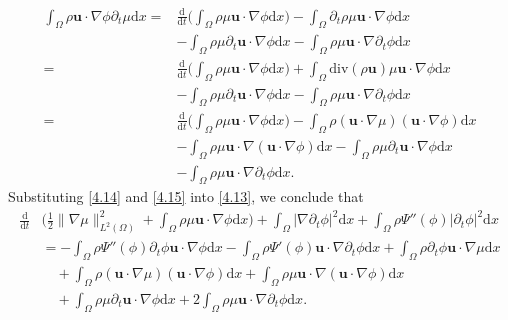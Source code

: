 \documentclass[11pt]{article}
\numberwithin{equation}{section}
\begin{document}
\begin{equation}
\begin{split}\label{4.15}
\int_{\Omega}\rho\mathbf{u}\cdot\nabla\phi\partial_t\mu\mathrm{d}x
=&\frac{\mathrm{d}}{\mathrm{d}t}\Big(\int_{\Omega}\rho\mu\mathbf{u}
\cdot\nabla\phi\mathrm{d}x\Big)-\int_{\Omega}\partial_t\rho\mu
\mathbf{u}\cdot\nabla\phi\mathrm{d}x \\
&-\int_{\Omega}\rho\mu\partial_t\mathbf{u}\cdot\nabla\phi\mathrm{d}x
-\int_{\Omega}\rho\mu\mathbf{u}\cdot\nabla\partial_t\phi\mathrm{d}x \\
=&\frac{\mathrm{d}}{\mathrm{d}t}\Big(\int_{\Omega}\rho\mu
\mathbf{u}\cdot\nabla\phi\mathrm{d}x\Big)
+\int_{\Omega}\text{div}(\rho\mathbf{u})\mu
\mathbf{u}\cdot\nabla\phi\mathrm{d}x \\
&-\int_{\Omega}\rho\mu\partial_t\mathbf{u}
\cdot\nabla\phi\mathrm{d}x-\int_{\Omega}\rho\mu
\mathbf{u}\cdot\nabla\partial_t\phi\mathrm{d}x \\
=&\frac{\mathrm{d}}{\mathrm{d}t}\Big(\int_{\Omega}
\rho\mu\mathbf{u}\cdot\nabla\phi\mathrm{d}x\Big)
-\int_{\Omega}\rho(\mathbf{u}\cdot\nabla\mu)
(\mathbf{u}\cdot\nabla\phi)\mathrm{d}x \\
&-\int_{\Omega}\rho\mu\mathbf{u}\cdot\nabla
(\mathbf{u}\cdot\nabla\phi)\mathrm{d}x
-\int_{\Omega}\rho\mu\partial_t\mathbf{u}\cdot\nabla\phi\mathrm{d}x \\
&-\int_{\Omega}\rho\mu\mathbf{u}\cdot\nabla\partial_t\phi\mathrm{d}x.
\end{split}
\end{equation}
Substituting \eqref{4.14} and \eqref{4.15} into \eqref{4.13}, we conclude that
\begin{equation}
\begin{split}\label{4.16}
\frac{\mathrm{d}}{\mathrm{d}t}&\Big(\frac{1}{2}\|\nabla\mu\|_{L^2(\Omega)}^2 + \int_{\Omega}\rho\mu\mathbf{u}\cdot\nabla\phi\mathrm{d}x\Big) + \int_{\Omega}|\nabla\partial_t\phi|^2\mathrm{d}x
 + \int_{\Omega}\rho\Psi''(\phi)|\partial_t\phi|^2\mathrm{d}x \\&= - \int_{\Omega}\rho\Psi''(\phi)\partial_t\phi\mathbf{u}\cdot
\nabla\phi\mathrm{d}x -\int_{\Omega}\rho\Psi'(\phi)\mathbf{u}
\cdot\nabla\partial_t\phi\mathrm{d}x + \int_{\Omega}\rho\partial_t\phi\mathbf{u}\cdot\nabla\mu\mathrm{d}x \\
&\quad +\int_{\Omega}\rho(\mathbf{u}\cdot\nabla\mu)
(\mathbf{u}\cdot\nabla\phi)\mathrm{d}x + \int_{\Omega}\rho\mu\mathbf{u}
\cdot\nabla(\mathbf{u}\cdot\nabla\phi)\mathrm{d}x \\
&\quad + \int_{\Omega}\rho\mu\partial_t\mathbf{u}\cdot\nabla\phi\mathrm{d}x + 2\int_{\Omega}\rho\mu\mathbf{u}\cdot\nabla\partial_t\phi\mathrm{d}x.
\end{split}
\end{equation}
\end{document}
